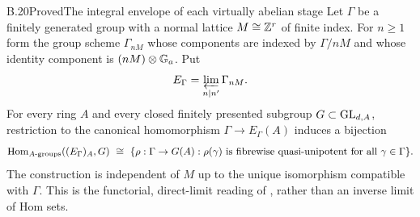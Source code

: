 \begin{statement}{B.20}{Proved}{The integral envelope of each virtually abelian stage}
Let $\Gamma$ be a finitely generated group with a normal lattice
$M\cong\mathbb Z^r$ of finite index. For $n\ge1$ form the group scheme
$\Gamma_{nM}$ whose components are indexed by $\Gamma/nM$ and whose
identity component is $(nM)\otimes\mathbb G_a$. Put
\[
 E_\Gamma=\varprojlim_{n\mid n'}\Gamma_{nM}.
\]
For every ring $A$ and every closed finitely presented subgroup
$G\subset\operatorname{GL}_{d,A}$, restriction to the canonical homomorphism
$\Gamma\to E_\Gamma(A)$ induces a bijection
\[
 \operatorname{Hom}_{A\text{-groups}}((E_\Gamma)_A,G)
 \ \cong\
 \{\rho:\Gamma\to G(A):\rho(\gamma)
       \text{ is fibrewise quasi-unipotent for all }\gamma\in\Gamma\}.
\]
The construction is independent of $M$ up to the unique isomorphism
compatible with $\Gamma$. This is the functorial, direct-limit reading
of \MS{50}{663--663'}{31--32}, rather than an inverse limit of Hom sets.
\end{statement}
